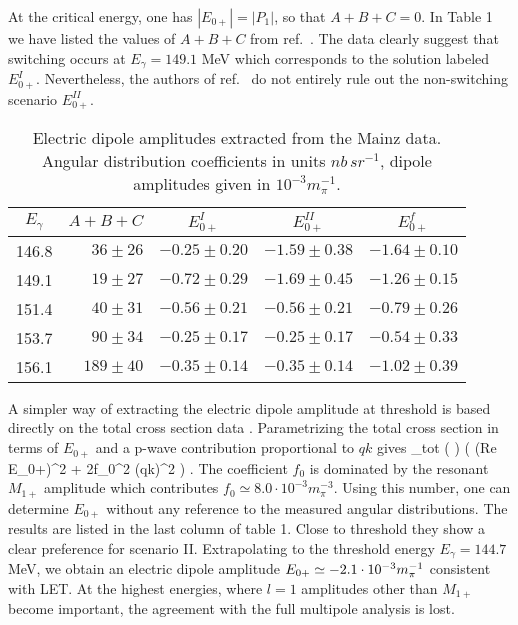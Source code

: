 At the critical energy, one has $|E_{0+}|=|P_1|$, so that $A+B+C=0$.
In Table 1 we have listed the values of $A+B+C$ from ref.~.
The data clearly suggest that switching occurs
at $E_\gamma=149.1$ MeV which corresponds to the solution labeled
$E_{0+}^{I}$. Nevertheless, the authors of ref.~ do
not entirely rule out the non-switching scenario $E_{0+}^{II}$.
\begin{table}
\caption{Electric dipole amplitudes extracted from the Mainz
data. Angular distribution coefficients in units $nb\,sr^{-1}$,
dipole amplitudes given in  $10^{-3} m_\pi^{-1}$.}
\begin{center}
\begin{tabular}{c|r|c|c|c} 
 $E_{\gamma}$  & $A+B+C$  &
         $ E_{0+}^I $ &  $E_{0+}^{II}$   & $E_{0+}^f$  \\ \hline
 146.8    & $36\pm 26$   & $-0.25\pm 0.20$  & $-1.59\pm 0.38$ 
                         & $-1.64\pm 0.10$     \\ 
 149.1    & $19\pm 27$   & $-0.72\pm 0.29$  & $-1.69\pm 0.45$ 
                         & $-1.26\pm 0.15$     \\  	      
 151.4    & $40\pm 31$   & $-0.56\pm 0.21$  & $-0.56\pm 0.21$ 
                         & $-0.79\pm 0.26$     \\  
 153.7    & $90\pm 34$   & $-0.25\pm 0.17$  & $-0.25\pm 0.17$ 
                         & $-0.54\pm 0.33$     \\ 
 156.1    & $189\pm 40$  & $-0.35\pm 0.14$  & $-0.35\pm 0.14$ 
                         & $-1.02\pm 0.39$     \\ 
\end{tabular}
\end{center}
\end{table}

A simpler way of extracting the electric dipole amplitude at threshold 
is based directly on the total cross section data \cite{Ber91,BH91}. 
Parametrizing the total cross section in terms of $E_{0+}$ and a p-wave 
contribution proportional to $qk$ gives 
\be
\label{xfit}  
\sigma_{tot}  \pi \left(  \right) 
 \left( ({\rm Re} E_{0+})^2 + 2f_0^2 (qk)^2 \right) \; .
\ee
The coefficient $f_0$ is dominated by the resonant $M_{1+}$ amplitude
which contributes $f_0\simeq 8.0 \cdot 10^{-3}m_\pi^{-3}$. Using
this number, one can determine $E_{0+}$ without any reference to the 
measured angular distributions. The results are listed in the last column 
of table 1. Close to threshold they show a clear preference for scenario II.
Extrapolating to the threshold energy $E_\gamma =144.7$ MeV, we obtain an
electric dipole amplitude $E_{0+}\simeq -2.1\cdot 10^{-3} m_\pi^{-1}$ consistent with LET. 
At the highest energies, where  $l=1$ amplitudes other than $M_{1+}$ become
important, the agreement with the full multipole analysis is lost.  
 
